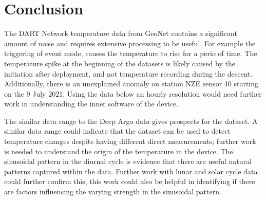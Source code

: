 \documentclass[12pt,a4paper]{article}
\begin{document}
\section{Conclusion}

The DART Network temperature data from GeoNet contains a significant amount
of noise and requires extensive processing to be useful. For example the
triggering of event mode, causes the temperature to rise for a perio of time. The temperature
spike at the beginning of the datasets is likely caused by the initiation after
deployment, and not temperature recording during the descent. Additionally,
there is an unexplained anomaly on station NZE sensor 40 starting on the 9 
July 2021. Using the data below an hourly resolution would need further work 
in understanding the inner software of the device.

The similar data range to the Deep Argo data gives prospects for the dataset.
A similar data range could indicate that the dataset can be used to detect
temperature changes despite having different direct measurements; further
work is needed to understand the origin of the temperature in the device. The
sinusoidal pattern in the diurnal cycle is evidence that there are useful
natural patterns captured within the data. Further work with lunar and solar
cycle data could further confirm this, this work could also be helpful in
identifying if there are factors influencing the varying strength in the
sinusoidal pattern.

\clearpage
\end{document}
